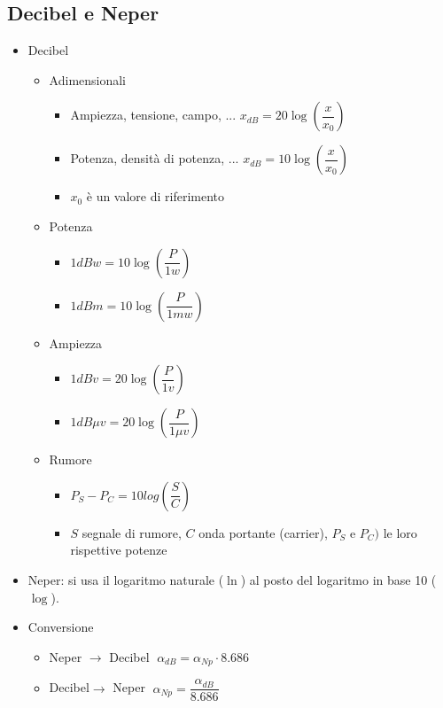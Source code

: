 \documentclass{article}
\begin{document}
\subsection{Decibel e Neper}
\begin{itemize}
	\item Decibel
	\begin{itemize}
		\item Adimensionali
		\begin{itemize}
			\item Ampiezza, tensione, campo, ... \( x_{dB} = 20 \log\left(\dfrac{x}{x_0}\right) \)
			\item Potenza, densità di potenza, ... \( x_{dB} = 10 \log\left(\dfrac{x}{x_0}\right) \)
			\item \(x_0\) è un valore di riferimento
		\end{itemize}
		\item Potenza 
		\begin{itemize}
			\item \(1 dBw = 10 \log\left(\dfrac{P}{1w}\right) \)
			\item \(1 dBm = 10 \log\left(\dfrac{P}{1mw}\right) \)
		\end{itemize}
		\item Ampiezza 
		\begin{itemize}
			\item \(1 dBv = 20 \log\left(\dfrac{P}{1v}\right) \)
			\item \(1 dB \mu v = 20 \log\left(\dfrac{P}{1 \mu v}\right) \)
		\end{itemize}
		\item Rumore
		\begin{itemize}
			\item \(P_S - P_C = 10 log \left( \dfrac{S}{C} \right) \)
			\item \(S\) segnale di rumore, \(C\) onda portante (carrier), \(P_S\) e \(P_C)\) le loro rispettive potenze
		\end{itemize}
	\end{itemize}
	\item Neper: si usa il logaritmo naturale (\( \ln \)) al posto del logaritmo in base 10 (\(\log\)).
	\item Conversione
	\begin{itemize}
		\item Neper \(\rightarrow\) Decibel \( \; \alpha_{dB} = \alpha_{Np} \cdot 8.686 \)
		\item Decibel\(\rightarrow\) Neper \( \; \alpha_{Np} = \dfrac{\alpha_{dB}}{8.686} \)
	\end{itemize}
\end{itemize}
\end{document}
